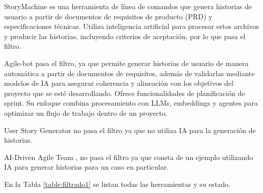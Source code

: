 StoryMachine \cite{storymachine} es una herramienta de línea de comandos que genera historias de usuario a partir de documentos de requisitos de producto (PRD) y especificaciones técnicas. Utiliza inteligencia artificial para procesar estos archivos y producir las historias, incluyendo criterios de aceptación, por lo que pasa el filtro.

Agile-bot \cite{agilebot} pasa el filtro, ya que permite generar historias de usuario de manera automática a partir de documentos de requisitos, además de validarlas mediante modelos de IA para asegurar coherencia y alineación con los objetivos del proyecto que se esté desarrollando. Ofrece funcionalidades de planificación de sprint. Su enfoque combina procesamiento con LLMs, embeddings y agentes para optimizar un flujo de trabajo dentro de un proyecto.

User Story Generator \cite{userstorygenerator} no pasa el filtro ya que no utiliza IA para la generación de historias.

AI-Driven Agile Team \cite{aidrivenagileteam}, no pasa el filtro ya que consta de un ejemplo utilizando IA para generar historias para un caso en particular.

En la Tabla \ref{table:filtrado1} se listan todas las herramientas y su estado.



